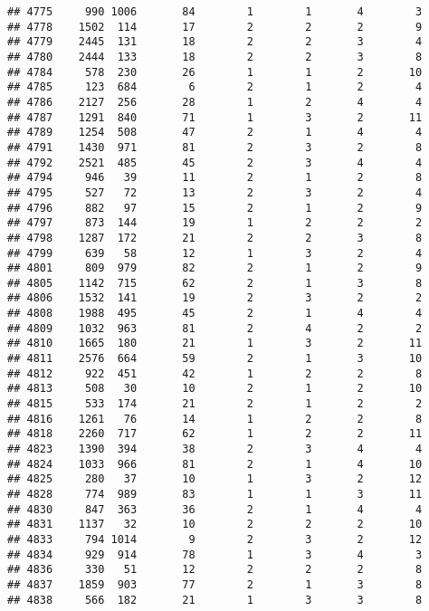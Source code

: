 \documentclass[]{article}
\begin{document}
\begin{verbatim}
## 4775     990 1006       84        1        1       4        3
## 4778    1502  114       17        2        2       2        9
## 4779    2445  131       18        2        2       3        4
## 4780    2444  133       18        2        2       3        8
## 4784     578  230       26        1        1       2       10
## 4785     123  684        6        2        1       2        4
## 4786    2127  256       28        1        2       4        4
## 4787    1291  840       71        1        3       2       11
## 4789    1254  508       47        2        1       4        4
## 4791    1430  971       81        2        3       2        8
## 4792    2521  485       45        2        3       4        4
## 4794     946   39       11        2        1       2        8
## 4795     527   72       13        2        3       2        4
## 4796     882   97       15        2        1       2        9
## 4797     873  144       19        1        2       2        2
## 4798    1287  172       21        2        2       3        8
## 4799     639   58       12        1        3       2        4
## 4801     809  979       82        2        1       2        9
## 4805    1142  715       62        2        1       3        8
## 4806    1532  141       19        2        3       2        2
## 4808    1988  495       45        2        1       4        4
## 4809    1032  963       81        2        4       2        2
## 4810    1665  180       21        1        3       2       11
## 4811    2576  664       59        2        1       3       10
## 4812     922  451       42        1        2       2        8
## 4813     508   30       10        2        1       2       10
## 4815     533  174       21        2        1       2        2
## 4816    1261   76       14        1        2       2        8
## 4818    2260  717       62        1        2       2       11
## 4823    1390  394       38        2        3       4        4
## 4824    1033  966       81        2        1       4       10
## 4825     280   37       10        1        3       2       12
## 4828     774  989       83        1        1       3       11
## 4830     847  363       36        2        1       4        4
## 4831    1137   32       10        2        2       2       10
## 4833     794 1014        9        2        3       2       12
## 4834     929  914       78        1        3       4        3
## 4836     330   51       12        2        2       2        8
## 4837    1859  903       77        2        1       3        8
## 4838     566  182       21        1        3       3        8

\end{verbatim}
\end{document}
